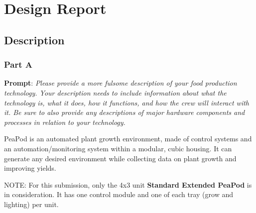 \documentclass{report}
\begin{document}
\section{Design Report}

\subsection{Description}
\label{sec:description}

\subsubsection{Part A}
\label{sec:description-a}

\textbf{Prompt}: \textit{Please provide a more fulsome description of your food production technology. Your description needs to include information about what the technology is, what it does, how it functions, and how the crew will interact with it. Be sure to also provide any descriptions of major hardware components and processes in relation to your technology.}

PeaPod is an automated plant growth environment, made of control systems and an automation/monitoring system within a modular, cubic housing. It can generate any desired environment while collecting data on plant growth and improving yields.

NOTE: For this submission, only the 4x3 unit \textbf{Standard Extended PeaPod} is in consideration. It has one control module and one of each tray (grow and lighting) per unit.
\end{document}
